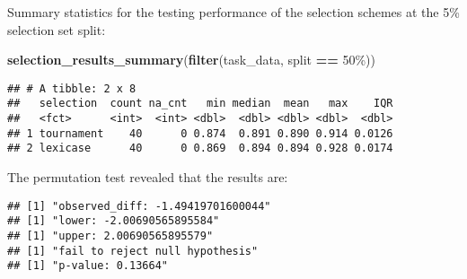 \documentclass[
]{book}
\newenvironment{Shaded}{\begin{snugshade}}{\end{snugshade}}
\newcommand{\AttributeTok}[1]{\textcolor[rgb]{0.13,0.29,0.53}{#1}}
\newcommand{\DecValTok}[1]{\textcolor[rgb]{0.00,0.00,0.81}{#1}}
\newcommand{\FunctionTok}[1]{\textcolor[rgb]{0.13,0.29,0.53}{\textbf{#1}}}
\newcommand{\NormalTok}[1]{#1}
\newcommand{\OtherTok}[1]{\textcolor[rgb]{0.56,0.35,0.01}{#1}}
\newcommand{\SpecialCharTok}[1]{\textcolor[rgb]{0.81,0.36,0.00}{\textbf{#1}}}
\newcommand{\StringTok}[1]{\textcolor[rgb]{0.31,0.60,0.02}{#1}}
\begin{document}
Summary statistics for the testing performance of the selection schemes at the 5\% selection set split:

\begin{Shaded}
\begin{Highlighting}[]
\FunctionTok{selection\_results\_summary}\NormalTok{(}\FunctionTok{filter}\NormalTok{(task\_data, split }\SpecialCharTok{==} \StringTok{\textquotesingle{}50\%\textquotesingle{}}\NormalTok{))}
\end{Highlighting}
\end{Shaded}

\begin{verbatim}
## # A tibble: 2 x 8
##   selection  count na_cnt   min median  mean   max    IQR
##   <fct>      <int>  <int> <dbl>  <dbl> <dbl> <dbl>  <dbl>
## 1 tournament    40      0 0.874  0.891 0.890 0.914 0.0126
## 2 lexicase      40      0 0.869  0.894 0.894 0.928 0.0174
\end{verbatim}

The permutation test revealed that the results are:

\begin{Shaded}
\end{Shaded}

\begin{verbatim}
## [1] "observed_diff: -1.49419701600044"
## [1] "lower: -2.00690565895584"
## [1] "upper: 2.00690565895579"
## [1] "fail to reject null hypothesis"
## [1] "p-value: 0.13664"
\end{verbatim}
\end{document}

